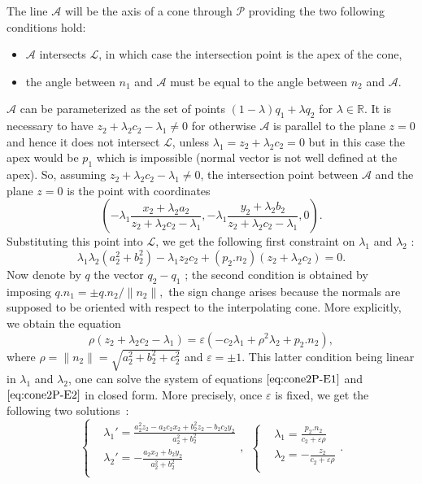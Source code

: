 \documentclass[5p]{elsarticle}
\newcommand\RR{\mathbb R}
\newcommand\Pc{\mathcal P}
\newcommand\Ac{\mathcal A}
\def\Lc{{\mathcal{L}}}
\newcommand{\com}[1]{{\color{black} #1}}
\begin{document}
The line $\Ac$ will be the axis of a cone through $\Pc$ providing the two following conditions hold: 
\begin{itemize}
	\item $\Ac$ \com{intersects} $\Lc$, in which case the intersection point is the apex of the cone,
	\item the angle between $n_1$ and $\Ac$ must be equal to the angle between $n_2$ and $\Ac$.
\end{itemize}
$\Ac$ can be parameterized as the set of points $(1-\lambda)q_1+\lambda q_2$ for $\lambda \in \RR$. It is necessary to have $z_2+\lambda_2c_2-\lambda_1\neq 0$ for otherwise $\Ac$ is parallel to the plane $z=0$ and hence it does not intersect $\Lc$, unless $\lambda_1=z_2+\lambda_2c_2=0$ but in this case the apex would be $p_1$ which is impossible (normal vector is not well defined at the apex). So, assuming $z_2+\lambda_2c_2-\lambda_1\neq 0$, the intersection point between $\Ac$ and the plane $z=0$ is the \com{point with} coordinates
\begin{equation}\label{eq:linesInter}
	\left(-\lambda_1\frac{x_2+\lambda_2a_2}{z_2+\lambda_2c_2-\lambda_1} , -\lambda_1 \frac{y_2+\lambda_2b_2}{z_2+\lambda_2c_2-\lambda_1}, 0\right).
\end{equation}
\com{Substituting this point into $\Lc$, we} get the following first constraint on $\lambda_1$ and $\lambda_2$ : 
\begin{equation}\label{eq:cone2P-E1}
	\lambda_1\lambda_2(a_2^2+b_2^2)-\lambda_1z_2c_2 + (p_2.n_2)(z_2+\lambda_2c_2)=0.
\end{equation}
\com{Now denote} by $q$ the vector $q_2-q_1$\com{;} the second condition is obtained by imposing 
$q.n_1=\pm q.n_2/\|n_2\|,$ the sign change \com{arises because} the normals are supposed to be oriented with respect to the interpolating cone. More explicitly, we obtain the equation
\begin{equation}\label{eq:cone2P-E2}
	\rho(z_2+\lambda_2c_2-\lambda_1) = \varepsilon (-c_2\lambda_1+\rho^2\lambda_2+p_2.n_2),
\end{equation}
where $\rho=\|n_2\|=\sqrt{a_2^2+b_2^2+c_2^2}$ and $\varepsilon=\pm 1$. 
This latter condition being linear in $\lambda_1$ and $\lambda_2$, one can solve the system of equations $\eqref{eq:cone2P-E1}$ and $\eqref{eq:cone2P-E2}$ in closed form. More precisely, once $\varepsilon$ is fixed, we get the \com{following two} solutions~:  
  \begin{equation*}
    \left\{
    \begin{aligned}
    &\lambda_1' = \frac{a_2^2z_2-a_2c_2x_2+b_2^2z_2-b_2c_2y_2}{a_2^2+b_2^2}\\
    &\lambda_2' = -\frac{a_2x_2+b_2y_2}{a_2^2+b_2^2}\\
    \end{aligned}
    \right., \ \ 
    \left\{
    \begin{aligned}
    &\lambda_1 = \frac{p_2.n_2}{c_2 + \varepsilon \rho}\\
    &\lambda_2 = - \frac{z_2}{c_2 +\varepsilon \rho }\\
    \end{aligned}
    \right..
  \end{equation*}
\end{document}
